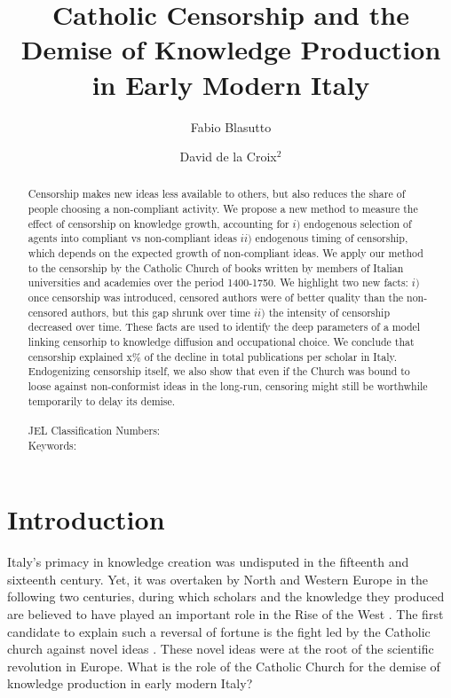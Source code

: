 \documentclass[12pt]{article}
\title{Catholic Censorship and the Demise of Knowledge Production in Early Modern Italy}
\author{Fabio Blasutto \and David de la Croix$^2$}
\begin{document}
\maketitle


\begin{abstract}
Censorship makes new ideas less available to others, but also reduces the share of people choosing a non-compliant activity. 
We propose a new method to measure the effect of censorship on knowledge growth,  accounting for $i)$ endogenous selection of agents into compliant vs non-compliant ideas $ii)$ endogenous timing of censorship, which depends on the expected growth of non-compliant ideas. 
We apply our method to the censorship by the Catholic Church of books written by members of Italian universities and academies over the period 1400-1750.
We highlight two new facts: $i)$ once censorship was introduced, censored authors were of better quality than the non-censored authors, but this gap shrunk over time $ii)$ the intensity of censorship decreased over time. These facts are used to identify the deep parameters of a model linking censorhip to knowledge diffusion and occupational choice. We conclude that censorship explained x\% of the decline in total publications per scholar in Italy. Endogenizing censorship itself, we also show that even if the Church was bound to loose against non-conformist ideas in the long-run, censoring might still be worthwhile temporarily to delay its demise.\\
\mbox{ }\\
JEL Classification Numbers: \\
Keywords:
\end{abstract}


\thispagestyle{empty}
\newpage
\onehalfspacing

\section{Introduction}
Italy's primacy in knowledge creation was undisputed in the fifteenth and sixteenth century. Yet, it was overtaken by North and Western Europe in the following two centuries, during which scholars and the knowledge they produced are believed to have played an important role in the Rise of the West \cite{mokyr2016}. The first candidate to explain such a reversal of fortune is the fight led by the Catholic church against novel ideas \cite{land99}. These novel ideas were at the root of the scientific revolution in Europe. What is the role of the Catholic Church for the demise of knowledge production in early modern Italy?
\end{document}
